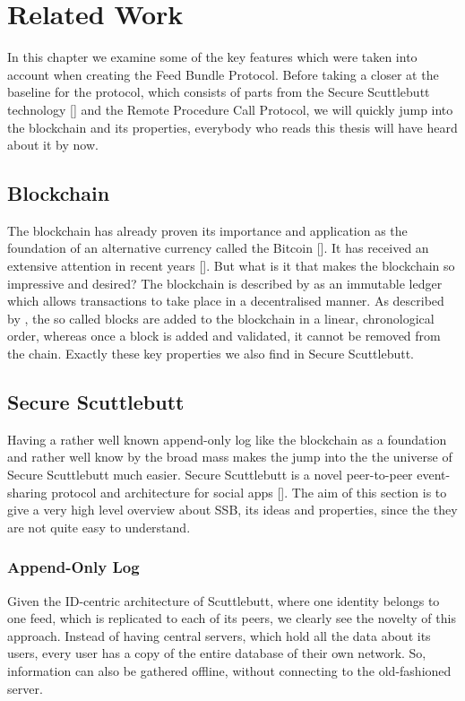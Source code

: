 \chapter{Related Work}
In this chapter we examine some of the key features which were taken into account when creating the Feed Bundle Protocol. Before taking a closer at the baseline for the protocol, which consists of parts from the Secure Scuttlebutt technology [] and the Remote Procedure Call Protocol, we will quickly jump into the blockchain and its properties, everybody who reads this thesis will have heard about it by now.
\section{Blockchain}
The blockchain has already proven its importance and application as the foundation of an alternative currency called the Bitcoin []. It has received an extensive attention in recent years []. But what is it that makes the blockchain so impressive and desired? The blockchain is described by \citet{8029379} as an immutable ledger which allows transactions to take place in a decentralised manner. 
As described by \citet{swan2015blockchain}, the so called blocks are added to the blockchain in a linear, chronological order, whereas once a block is added and validated, it cannot be removed from the chain. Exactly these key properties we also find in Secure Scuttlebutt.
\section{Secure Scuttlebutt}
Having a rather well known append-only log like the blockchain as a foundation and rather well know by the broad mass makes the jump into the the universe of Secure Scuttlebutt much easier. Secure Scuttlebutt is a novel peer-to-peer event-sharing protocol and architecture for social apps []. The aim of this section is to give a very high level overview about SSB, its ideas and properties, since the they are not quite easy to understand.

\subsection{Append-Only Log}
Given the ID-centric architecture of Scuttlebutt, where one identity belongs to one feed, which is replicated to each of its peers, we clearly see the novelty of this approach. Instead of having central servers, which hold all the data about its users, every user has a copy of the entire database of their own network. So, information can also be gathered offline, without connecting to the old-fashioned server. 


